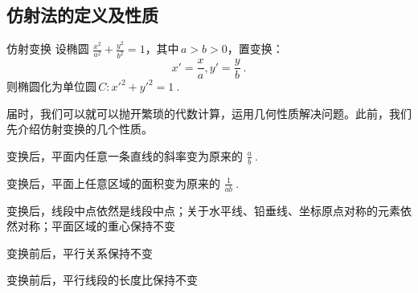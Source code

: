 \subsection{仿射法的定义及性质}
\begin{definition}{仿射变换}
设椭圆 $\displaystyle{\frac{x^2}{a^2}+\frac{y^2}{b^2}=1}$，其中\,$\displaystyle{a>b>0}$，置变换：
$$x'=\frac{x}{a},y'=\frac{y}{b}~.$$
则椭圆化为单位圆\,$\displaystyle{C:x'^2+y'^2=1}~.$
\end{definition}
届时，我们可以就可以抛开繁琐的代数计算，运用几何性质解决问题。此前，我们先介绍仿射变换的几个性质。
\begin{lemma}{}
变换后，平面内任意一条直线的斜率变为原来的 $\displaystyle{\frac{a}{b}}~.$
\end{lemma}
\begin{lemma}{}
变换后，平面上任意区域的面积变为原来的 $\displaystyle{\frac1{ab}}~.$
\end{lemma}
\begin{lemma}{}
变换后，线段中点依然是线段中点；关于水平线、铅垂线、坐标原点对称的元素依然对称；平面区域的重心保持不变
\end{lemma}
\begin{lemma}{}
变换前后，平行关系保持不变
\end{lemma}
\begin{lemma}{}
变换前后，平行线段的长度比保持不变
\end{lemma}
